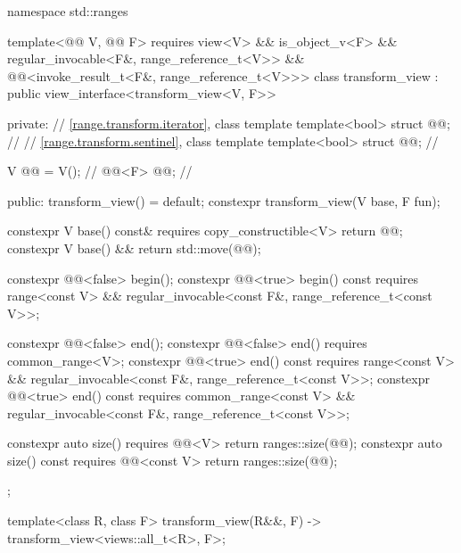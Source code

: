 %
%
%
\begin{codeblock}
namespace std::ranges {
  template<@@ V, @@ F>
    requires view<V> && is_object_v<F> &&
             regular_invocable<F&, range_reference_t<V>> &&
             @@<invoke_result_t<F&, range_reference_t<V>>>
  class transform_view : public view_interface<transform_view<V, F>> {
  private:
    // \ref{range.transform.iterator}, class template 
    template<bool> struct @@;             // \expos
    // \ref{range.transform.sentinel}, class template 
    template<bool> struct @@;             // \expos

    V @@ = V();                              // \expos
    @@<F> @@;                    // \expos

  public:
    transform_view() = default;
    constexpr transform_view(V base, F fun);

    constexpr V base() const& requires copy_constructible<V> { return @@; }
    constexpr V base() && { return std::move(@@); }

    constexpr @@<false> begin();
    constexpr @@<true> begin() const
      requires range<const V> &&
               regular_invocable<const F&, range_reference_t<const V>>;

    constexpr @@<false> end();
    constexpr @@<false> end() requires common_range<V>;
    constexpr @@<true> end() const
      requires range<const V> &&
               regular_invocable<const F&, range_reference_t<const V>>;
    constexpr @@<true> end() const
      requires common_range<const V> &&
               regular_invocable<const F&, range_reference_t<const V>>;

    constexpr auto size() requires @@<V> { return ranges::size(@@); }
    constexpr auto size() const requires @@<const V>
    { return ranges::size(@@); }
  };

  template<class R, class F>
    transform_view(R&&, F) -> transform_view<views::all_t<R>, F>;
}
\end{codeblock}

